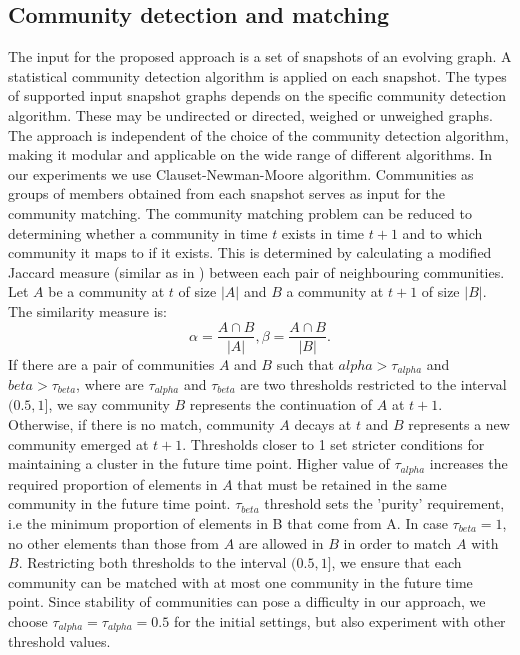 \documentclass{article} %
\begin{document}
\subsection{Community detection and matching}
The input for the proposed approach is a set of snapshots of an evolving graph. A statistical community detection algorithm is applied on each snapshot. The types of supported input snapshot graphs depends on the specific community detection algorithm. These may be  undirected or directed, weighed or unweighed graphs. The approach is independent of the choice of the community detection algorithm, making it modular and applicable on the wide range of different algorithms. In our experiments we use Clauset-Newman-Moore\cite{clauset-newman-moore} algorithm. Communities as groups of members obtained from each snapshot serves as input for the community matching. The community matching problem can be reduced to determining whether a community in time $t$ exists in time $t+1$ and to which community it maps to if it exists. This is determined by calculating a modified Jaccard measure (similar as in \cite{gliwa2013})  between each pair of neighbouring communities. Let  $A$ be a community at $t$ of size $|A|$ and $B$ a community at $t+1$ of size $|B|$. The similarity measure is:
\begin{equation}
\alpha = \frac{A\cap B}{|A|},
\beta = \frac{A\cap B}{|B|}.
\end{equation}
If there are a pair of communities $A$ and $B$ such that $alpha > \tau_{alpha}$ and $beta > \tau_{beta}$, where are $\tau_{alpha}$ and $\tau_{beta}$ are two thresholds restricted to the interval $(0.5, 1]$, we say community $B$ represents the continuation of $A$ at $t+1$. Otherwise, if there is no match, community $A$ decays at $t$ and $B$ represents a new community emerged at $t+1$. Thresholds closer to 1 set stricter conditions for maintaining a cluster in the future time point. Higher value of $\tau_{alpha}$ increases the required proportion of elements in $A$ that must be retained in the same community in the future time point. $\tau_{beta}$ threshold sets the 'purity' requirement, i.e the minimum proportion of elements in B that come from A. In case $\tau_{beta} = 1$, no other elements than those from $A$ are allowed in $B$ in order to match $A$ with $B$. Restricting both thresholds to the interval $(0.5, 1]$, we ensure that each community can be matched with at most one community in the future time point. Since stability of communities can pose a difficulty in our approach, we choose $\tau_{alpha} = \tau_{alpha} = 0.5$ for the initial settings, but also experiment with other threshold values.
\end{document}
